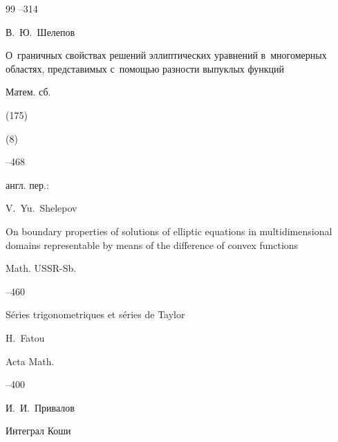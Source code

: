 \begin{thebibliography}{99}
--314





\pagebreak




\by В.~Ю.~Шелепов

\paper О~граничных свойствах решений эллиптических уравнений в~многомерных областях, представимых с~помощью разности выпуклых функций

\jour Матем. сб.


(175)

(8)

--468




\transl англ. пер.:~

\by V.~Yu.~Shelepov

\paper On boundary properties of solutions of elliptic equations in multidimensional domains representable by means of the difference of convex functions

\jour Math. USSR-Sb.




--460





\paper S\'eries trigonometriques et s\'eries de Taylor

\by H.~Fatou

\jour Acta Math. 




--400








\by И.~И.~Привалов

\book Интеграл Коши


\end{thebibliography}
